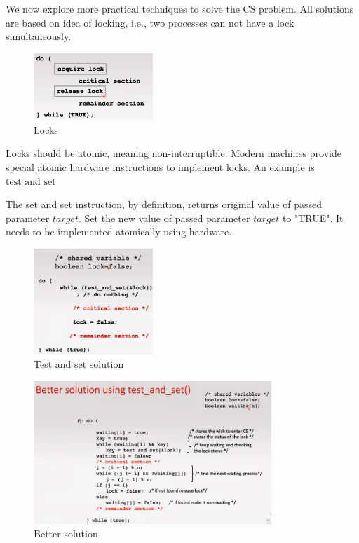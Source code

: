 \documentclass[a4paper]{article}
\theoremstyle{plain}
\theoremstyle{definition}
\newtheorem{defn}{Definition}[section]
\newtheorem{exmp}{Example}[section]
\theoremstyle{remark}
\begin{document}
\begin{tcolorbox}[colback=black!3!white,colframe=black!60!white,title=\begin{defn}Locks \label{Locks}\end{defn}]
We now explore more practical techniques to solve the CS problem. All solutions are based on idea of locking, i.e., two processes can not have a lock simultaneously. 
\begin{figure}[H]
	\centering
	\includegraphics[width=0.4\textwidth]{fourtytwo.png}
	\caption{Locks}
	\label{fig:fourtytwo-png}
\end{figure}
Locks should be atomic, meaning non-interruptible. Modern machines provide special atomic hardware instructions to implement locks. An example is $\text{test}\_\text{and}\_\text{set}$
\end{tcolorbox}
\begin{tcolorbox}[colback=black!3!white,colframe=black!60!white,title=\begin{exmp}Test and set Instruction \label{Test and set Instruction}\end{exmp}]
        The set and set instruction, by definition, returns original value of passed parameter $target$. Set the new value of passed parameter $target$ to "TRUE". It needs to be implemented atomically using hardware.
	\begin{figure}[H]
		\centering
		\includegraphics[width=0.4\textwidth]{fourtythree.png}
		\caption{Test and set solution}
		\label{fig:fourtythree-png}
	\end{figure}
	\begin{figure}[H]
		\centering
		\includegraphics[width=0.8\textwidth]{fourtyfour.png}
		\caption{Better solution}
		\label{fig:fourtyfour-png}
	\end{figure}
\end{tcolorbox}
\end{document}
